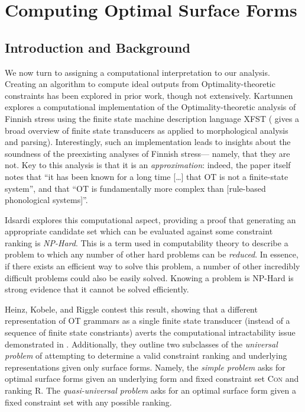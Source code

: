 \documentclass[12pt]{article}
\begin{document}
\pagebreak

\section{Computing Optimal Surface Forms}
\label{sec:computing-optimal-surface-forms}

\subsection{Introduction and Background}

We now turn to assigning a computational interpretation to our analysis.
Creating an algorithm to compute ideal outputs from Optimality-theoretic
constraints has been explored in prior work, though not extensively. Kartunnen
\cite{karttunen2006finite} explores a computational implementation of the
Optimality-theoretic analysis of Finnish stress using the finite state machine
description language XFST (\cite{karttunen2001applications} gives a broad
overview of finite state transducers as applied to morphological analysis and
parsing). Interestingly, such an implementation leads to insights about the
soundness of the preexisting analyses of Finnish stress--- namely, that they
are not. Key to this analysis is that it is an \textit{approximation}: indeed,
the paper itself notes that ``it has been known for a long time [\ldots] that
\textsc{OT} is not a finite-state system'', and that ``\textsc{OT} is
fundamentally more complex than [rule-based phonological systems]''.

Idsardi \cite{idsardi2006simple} explores this computational aspect, providing
a proof that generating an appropriate candidate set which can be evaluated
against some constraint ranking is \textit{NP-Hard}. This is a term used in
computability theory to describe a problem to which any number of other hard
problems can be \textit{reduced}. In essence, if there exists an efficient way
to solve this problem, a number of other incredibly difficult problems could
also be easily solved. Knowing a problem is NP-Hard is strong evidence that it
cannot be solved efficiently.

Heinz, Kobele, and Riggle \cite{heinz2009evaluating} contest this result,
showing that a different representation of \textsc{OT} grammars as a single
finite state transducer (instead of a sequence of finite state constriants)
averts the computational intractability issue demonstrated in
\cite{idsardi2006simple}. Additionally, they outline two subclasses of the
\textit{universal problem} of attempting to determine a valid constraint
ranking and underlying representations given only surface forms. Namely,
the \textit{simple problem} asks for optimal surface forms given an underlying
form and fixed constraint set \textsc{Con} and ranking \textsc{R}. The
\textit{quasi-universal problem} asks for an optimal surface form given
a fixed constraint set with any possible ranking.
\end{document}
